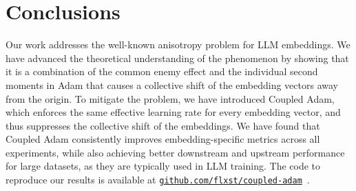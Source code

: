 \section{Conclusions}

Our work addresses the well-known anisotropy problem for LLM embeddings. 
We have advanced the theoretical understanding of the phenomenon by showing that it is a combination of the common enemy effect and the individual second moments in Adam that causes a collective shift of the embedding vectors away from the origin.
To mitigate the problem, we have introduced Coupled Adam, which enforces the same effective learning rate for every embedding vector, and thus suppresses the collective shift of the embeddings.
We have found that Coupled Adam consistently improves embedding-specific metrics across all experiments, while also achieving better downstream and upstream performance for large datasets, as they are typically used in LLM training.
The code to reproduce our results is available at \href{https://github.com/flxst/coupled-adam}{\nolinkurl{github.com/flxst/coupled-adam}}~.
